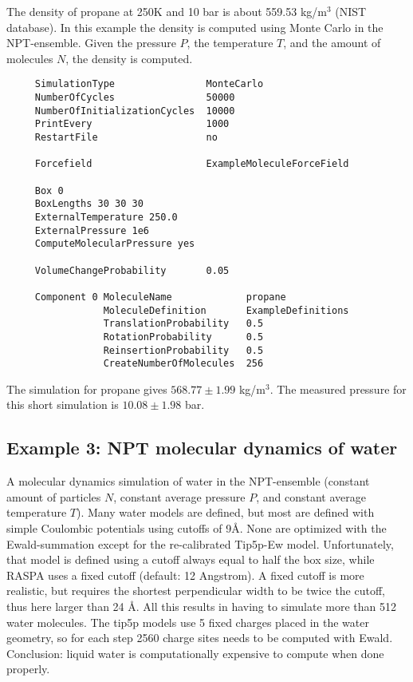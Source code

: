 The density of propane at 250K and 10 bar is about 559.53 kg/m$^3$ (NIST database). In this example the density is
computed using Monte Carlo in the NPT-ensemble. Given the pressure $P$, the temperature $T$, and the amount of molecules $N$,
the density is computed.

\begin{tiny}
\begin{verbatim}
     SimulationType                MonteCarlo
     NumberOfCycles                50000
     NumberOfInitializationCycles  10000
     PrintEvery                    1000
     RestartFile                   no

     Forcefield                    ExampleMoleculeForceField

     Box 0
     BoxLengths 30 30 30
     ExternalTemperature 250.0
     ExternalPressure 1e6
     ComputeMolecularPressure yes

     VolumeChangeProbability       0.05

     Component 0 MoleculeName             propane
                 MoleculeDefinition       ExampleDefinitions
                 TranslationProbability   0.5
                 RotationProbability      0.5
                 ReinsertionProbability   0.5
                 CreateNumberOfMolecules  256
\end{verbatim}
\end{tiny}
The simulation for propane gives $568.77\pm 1.99$ kg/m$^3$.
The measured pressure for this short simulation is $10.08\pm1.98$ bar.


\subsection*{Example 3: NPT molecular dynamics of water}
A molecular dynamics simulation of water in the NPT-ensemble
(constant amount of particles $N$, constant average pressure $P$, and constant average temperature $T$).
Many water models are defined, but most are defined with simple Coulombic potentials using cutoffs of 9\AA.
None are optimized with the Ewald-summation except for the re-calibrated Tip5p-Ew model.
Unfortunately, that model is defined using a cutoff always equal to half the box size, while
RASPA uses a fixed cutoff (default: 12 Angstrom). A fixed cutoff is more realistic, but requires the shortest
perpendicular width to be twice the cutoff, thus here larger than 24 \AA. All this results in having
to simulate more than 512 water molecules. The tip5p models use 5 fixed charges placed in the water geometry,
so for each step 2560 charge sites needs to be computed with Ewald. Conclusion: liquid water is computationally
expensive to compute when done properly.

